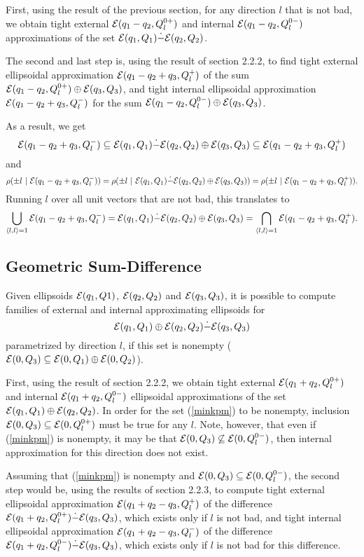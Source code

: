 First, using the result of the previous section, for any direction $l$ that
is not bad, we obtain tight external $\EE(q_1-q_2, Q_l^{0+})$ and internal
$\EE(q_1-q_2, Q_l^{0-})$ approximations of the set
$\EE(q_1,Q_1)\dot{-}\EE(q_2,Q_2)$.

The second and last step is, using the result of section 2.2.2, to find
tight external ellipsoidal approximation $\EE(q_1-q_2+q_3,Q_l^+)$ of the sum
$\EE(q_1-q_2,Q_l^{0+})\oplus\EE(q_3,Q_3)$, and tight internal ellipsoidal
approximation $\EE(q_1-q_2+q_3,Q_l^-)$ for the sum
$\EE(q_1-q_2,Q_l^{0-})\oplus\EE(q_3,Q_3)$.

As a result, we get
\[ \EE(q_1-q_2+q_3,Q_l^-) \subseteq
\EE(q_1,Q_1)\dot{-}\EE(q_2,Q_2)\oplus\EE(q_3,Q_3) \subseteq
\EE(q_1-q_2+q_3,Q_l^+) \]
and
\[ \rho(\pm l ~|~\EE(q_1-q_2+q_3,Q_l^-)) =
\rho(\pm l ~|~ \EE(q_1,Q_1)\dot{-}\EE(q_2,Q_2)\oplus\EE(q_3,Q_3)) =
\rho(\pm l ~|~ \EE(q_1-q_2+q_3,Q_l^+)). \]
Running $l$ over all unit vectors that are not bad, this translates to
\[ \bigcup_{\langle l,l\rangle=1} \EE(q_1-q_2+q_3,Q_l^-) =
\EE(q_1,Q_1)\dot{-}\EE(q_2,Q_2)\oplus\EE(q_3,Q_3) =
\bigcap_{\langle l,l\rangle=1} \EE(q_1-q_2+q_3,Q_l^+) .\]


\subsection{Geometric Sum-Difference}\label{subsec_sumdiff}
Given ellipsoids $\EE(q_1,Q1)$, $\EE(q_2,Q_2)$ and $\EE(q_3,Q_3)$, it is
possible to compute families of external and internal approximating
ellipsoids for
\begin{equation}
\EE(q_1,Q_1) \oplus \EE(q_2,Q_2) \dot{-} \EE(q_3,Q_3) \label{minkpm}
\end{equation}
parametrized by direction $l$, if this set is nonempty
($\EE(0,Q_3)\subseteq\EE(0,Q_1)\oplus\EE(0,Q_2)$).

First, using the result of section 2.2.2, we obtain tight external
$\EE(q_1+q_2,Q_l^{0+})$ and internal $\EE(q_1+q_2,Q_l^{0-})$ ellipsoidal
approximations of the set $\EE(q_1,Q_1)\oplus\EE(q_2,Q_2)$.
In order for the set (\ref{minkpm}) to be nonempty, inclusion
$\EE(0,Q_3)\subseteq\EE(0,Q_l^{0+})$ must be true for any $l$.
Note, however, that even if (\ref{minkpm}) is nonempty, it may be that
$\EE(0,Q_3)\not\subseteq\EE(0,Q_l^{0-})$, then internal approximation for this
direction does not exist.

Assuming that (\ref{minkpm}) is nonempty and
$\EE(0,Q_3)\subseteq\EE(0,Q_l^{0-})$, the second step would be, using the
results of section 2.2.3, to compute tight external ellipsoidal approximation
$\EE(q_1+q_2-q_3,Q_l^+)$ of the difference
$\EE(q_1+q_2,Q_l^{0+})\dot{-}\EE(q_3,Q_3)$, which exists only if $l$ is not
bad, and tight internal ellipsoidal approximation
$\EE(q_1+q_2-q_3,Q_l^-)$ of the difference
$\EE(q_1+q_2,Q_l^{0-})\dot{-}\EE(q_3,Q_3)$, which exists only if $l$ is not
bad for this difference.

